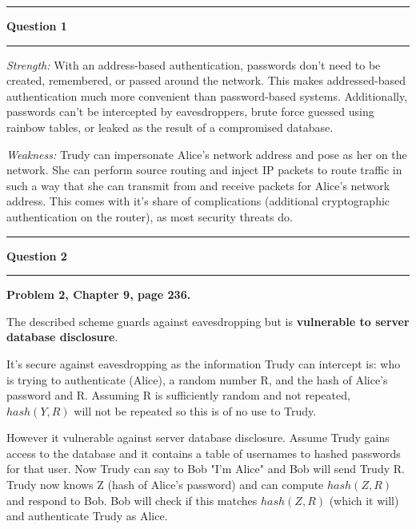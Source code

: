 \documentclass[11pt]{article}
\newcommand\question[2]{\vspace{.25in}\hrule\textbf{#1}\vspace{.5em}\hrule\vspace{.10in}}
\renewcommand\part[1]{\vspace{.10in}\textbf{(#1)}}
\begin{document}
\raggedright
\newcommand\NAME{Jake Pitkin}  %
\newcommand\UID{u0891770}     %
\newcommand\HWNUM{4}              %

\question{Question 1}

\textbf{Suppose a computer is authenticated based on its IP address (no passwords are used). Identify one strength and one weakness of such an authentication mechanism.}

\textit{Strength:} With an address-based authentication, passwords don't need to be created, remembered, or passed around the network. This makes addressed-based authentication much more convenient than password-based systems. Additionally, passwords can't be intercepted by eavesdroppers, brute force guessed using rainbow tables, or leaked as the result of a compromised database.

\textit{Weakness:} Trudy can impersonate Alice's network address and pose as her on the network. She can perform source routing and inject IP packets to route traffic in such a way that she can transmit from and receive packets for Alice's network address. This comes with it's share of complications (additional cryptographic authentication on the router), as most security threats do.

\question{Question 2}

\part{a} \textbf{Problem 2, Chapter 9, page 236.}

The described scheme guards against eavesdropping but is \textbf{vulnerable to server database disclosure}.

It's secure against eavesdropping as the information Trudy can intercept is: who is trying to authenticate (Alice), a random number R, and the hash of Alice's password and R. Assuming R is sufficiently random and not repeated, $hash(Y,R)$ will not be repeated so this is of no use to Trudy.

However it vulnerable against server database disclosure. Assume Trudy gains access to the database and it contains a table of usernames to hashed passwords for that user. Now Trudy can say to Bob "I'm Alice" and Bob will send Trudy R. Trudy now knows Z (hash of Alice's password) and can compute $hash(Z,R)$ and respond to Bob. Bob will check if this matches $hash(Z,R)$ (which it will) and authenticate Trudy as Alice. 
\end{document}
